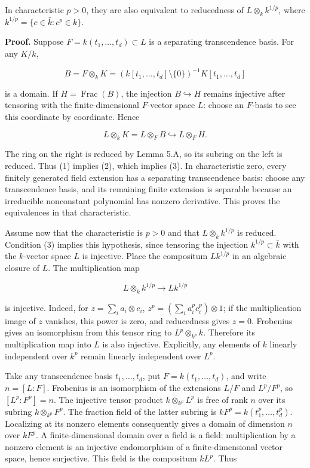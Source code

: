 \documentclass[
]{article}
\begin{document}
In characteristic \(p>0\), they are also equivalent to reducedness of
\(L\otimes_k k^{1/p}\), where \(k^{1/p}=\{c\in\bar k:c^p\in k\}\).

\textbf{Proof.} Suppose \(F=k(t_1,\ldots,t_d)\subset L\) is a separating
transcendence basis. For any \(K/k\),

\[
B=F\otimes_k K=(k[t_1,\ldots,t_d]\setminus\{0\})^{-1}K[t_1,\ldots,t_d]
\]

is a domain. If \(H=\operatorname{Frac}(B)\), the injection
\(B\hookrightarrow H\) remains injective after tensoring with the
finite-dimensional \(F\)-vector space \(L\): choose an \(F\)-basis to
see this coordinate by coordinate. Hence

\[
L\otimes_k K=L\otimes_F B\hookrightarrow L\otimes_F H.
\]

The ring on the right is reduced by Lemma 5.A, so its subring on the
left is reduced. Thus (1) implies (2), which implies (3). In
characteristic zero, every finitely generated field extension has a
separating transcendence basis: choose any transcendence basis, and its
remaining finite extension is separable because an irreducible
nonconstant polynomial has nonzero derivative. This proves the
equivalences in that characteristic.

Assume now that the characteristic is \(p>0\) and that
\(L\otimes_k k^{1/p}\) is reduced. Condition (3) implies this
hypothesis, since tensoring the injection \(k^{1/p}\subset\bar k\) with
the \(k\)-vector space \(L\) is injective. Place the compositum
\(Lk^{1/p}\) in an algebraic closure of \(L\). The multiplication map

\[
L\otimes_k k^{1/p}\longrightarrow Lk^{1/p}
\]

is injective. Indeed, for \(z=\sum_i a_i\otimes c_i\),
\(z^p=(\sum_i a_i^pc_i^p)\otimes1\); if the multiplication image of
\(z\) vanishes, this power is zero, and reducedness gives \(z=0\).
Frobenius gives an isomorphism from this tensor ring to
\(L^p\otimes_{k^p}k\). Therefore its multiplication map into \(L\) is
also injective. Explicitly, any elements of \(k\) linearly independent
over \(k^p\) remain linearly independent over \(L^p\).

Take any transcendence basis \(t_1,\ldots,t_d\), put
\(F=k(t_1,\ldots,t_d)\), and write \(n=[L:F]\). Frobenius is an
isomorphism of the extensions \(L/F\) and \(L^p/F^p\), so
\([L^p:F^p]=n\). The injective tensor product \(k\otimes_{k^p}L^p\) is
free of rank \(n\) over its subring \(k\otimes_{k^p}F^p\). The fraction
field of the latter subring is \(kF^p=k(t_1^p,\ldots,t_d^p)\).
Localizing at its nonzero elements consequently gives a domain of
dimension \(n\) over \(kF^p\). A finite-dimensional domain over a field
is a field: multiplication by a nonzero element is an injective
endomorphism of a finite-dimensional vector space, hence surjective.
This field is the compositum \(kL^p\). Thus
\end{document}
